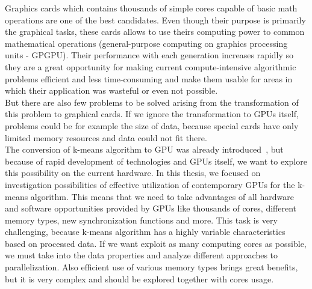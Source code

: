 Graphics cards which contains thousands of simple cores capable of basic math operations are one of the best candidates. Even though their purpose is primarily the graphical tasks, these cards allows to use theirs computing power to common mathematical operations (general-purpose computing on graphics processing units - GPGPU). Their performance with each generation increases rapidly so they are a great opportunity for making current compute-intensive algorithmic problems efficient and less time-consuming and make them usable for areas in which their application was wasteful or even not possible.\\
But there are also few problems to be solved arising from the transformation of this problem to graphical cards. If we ignore the transformation to GPUs itself, problems could be for example the size of data, because special cards have only limited memory resources and data could not fit there.\\

The conversion of k-means algorithm to GPU was already introduced~\cite{Hong09}, but because of rapid development of  technologies and GPUs itself, we want to explore this possibility on the current hardware. In this thesis, we focused on investigation possibilities of effective utilization of contemporary GPUs for the k-means algorithm. This means that we need to take advantages of all hardware and software opportunities provided by GPUs like thousands of cores, different memory types, new synchronization functions and more. This task is very challenging, because k-means algorithm has a highly variable characteristics based on processed data. If we want exploit as many computing cores as possible, we must take into the data properties and analyze different approaches to parallelization. Also efficient use of various memory types brings great benefits, but it is very complex and should be explored together with cores usage.\\



